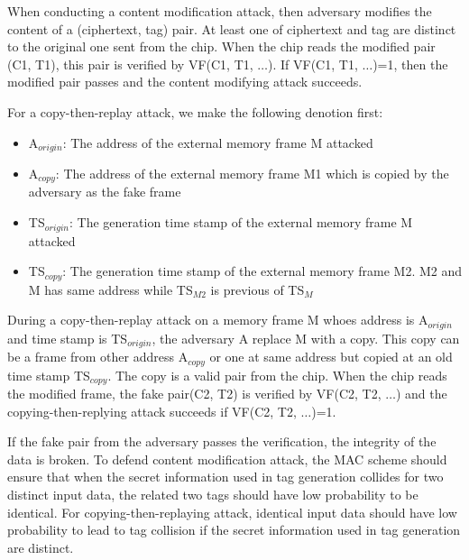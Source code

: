 \documentclass{article}
\begin{document}
When conducting a content modification attack, then adversary modifies the content of a (ciphertext, tag) pair. At least one of ciphertext and tag are distinct to the original one sent from the chip. When the chip reads the modified pair (C1, T1), this pair is verified by VF(C1, T1, $\ldots$). If VF(C1, T1, $\ldots$)=1, then the modified pair passes and the content modifying attack succeeds. 

For a copy-then-replay attack, we make the following denotion first:
\begin{itemize}
	\item A$_{origin}$: The address of the external memory frame M attacked 
	\item A$_{copy}$: The address of the external memory frame M1 which is copied by the adversary as the fake frame
	\item TS$_{origin}$: The generation time stamp of the external memory frame M attacked
	\item TS$_{copy}$: The generation time stamp of the external memory frame M2. M2 and M has same address while TS$_{M2}$ is previous of TS$_M$ 
\end{itemize}
During a copy-then-replay attack on a memory frame M whoes address is A$_{origin}$ and time stamp is TS$_{origin}$, the adversary A replace M with a copy. This copy can be a frame from other address A$_{copy}$ or one at same address but copied at an old time stamp TS$_{copy}$. The copy is a valid pair from the chip. 
When the chip reads the modified frame, the fake pair(C2, T2) is verified by VF(C2, T2, $\ldots$) and the copying-then-replying attack succeeds if VF(C2, T2, $\ldots$)=1.  

If the fake pair from the adversary passes the verification, the integrity of the data is broken. To defend content modification attack, the MAC scheme should ensure that when the secret information used in tag generation collides for two distinct input data, the related two tags should have low probability to be identical. For copying-then-replaying attack, identical input data should have low probability to lead to tag collision if the secret information used in tag generation are distinct. 



\end{document}
